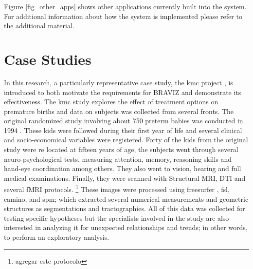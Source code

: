 \documentclass[utf8,paper]{frontiersSCNS} %
\begin{document}
Figure \ref{fig_other_apps} shows other applications currently built into the system. For additional information about how the system is implemented please refer to the additional material.

\section{Case Studies}

In this research, a particularly representative case study, the kmc project \citep{schneider_cerebral_2012}, is introduced to both motivate the requirements for BRAVIZ and demonstrate its effectiveness. The kmc study explores the effect of treatment options on premature births and data on subjects was collected from several fronts. The original randomized study involving about 750 preterm babies was conducted in 1994 \citep{charpak_kangaroo_1997}. These kids were followed during their first year \citep{charpak_randomized_2001, tessier_kangaroo_2009} of life and several clinical and socio-economical variables were registered. Forty of the kids from the original study were re located at fifteen years of age, the  subjects went through several neuro-psychological tests, measuring attention, memory, reasoning skills and hand-eye coordination among others. They also went to vision, hearing and full medical examinations. Finally, they were scanned with Structural MRI, DTI and several fMRI protocols. \footnote{agregar este protocolo} These images were processed using freesurfer \citep{fischl_freesurfer_2012}, fsl\citep{jenkinson_fsl_2012}, camino\citep{cook_camino:_2006}, and spm\citep{friston_statistical_2006}; which extracted several numerical measurements and geometric structures as segmentations and tractographies. All of this data was collected for testing specific hypotheses but the specialists involved in the study are also interested in analyzing it for unexpected relationships and trends; in other words, to perform an exploratory analysis\citep{tukey_we_1980}.
\end{document}
